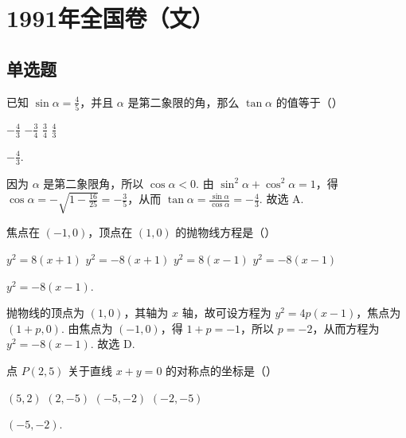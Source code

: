 \chapter{1991年全国卷（文）}
\section{单选题}

\begin{problem}
已知 \(\sin \alpha = \frac{4}{5}\)，并且 \(\alpha\) 是第二象限的角，那么 \(\tan \alpha\) 的值等于（\quad）

\choices
    {\(-\frac{4}{3}\)}
    {\(-\frac{3}{4}\)}
    {\(\frac{3}{4}\)}
    {\(\frac{4}{3}\)}
\end{problem}

\begin{answer}
\(-\frac{4}{3}\).
\end{answer}

\begin{solution}
因为 \(\alpha\) 是第二象限角，所以 \(\cos\alpha<0\). 由 \(\sin^2\alpha+\cos^2\alpha=1\)，得 \(\cos\alpha=-\sqrt{1-\frac{16}{25}}=-\frac{3}{5}\)，从而 \(\tan\alpha=\frac{\sin\alpha}{\cos\alpha}=-\frac{4}{3}\). 故选 A.
\end{solution}

\begin{problem}
焦点在 \((-1,0)\)，顶点在 \((1,0)\) 的抛物线方程是（\quad）

\choices
    {\(y^{2} = 8(x + 1)\)}
    {\(y^{2} = -8(x + 1)\)}
    {\(y^{2} = 8(x - 1)\)}
    {\(y^{2} = -8(x - 1)\)}
\end{problem}

\begin{answer}
\(y^{2}=-8(x-1)\).
\end{answer}

\begin{solution}
抛物线的顶点为 \((1,0)\)，其轴为 \(x\) 轴，故可设方程为 \(y^2=4p(x-1)\)，焦点为 \((1+p,0)\). 由焦点为 \((-1,0)\)，得 \(1+p=-1\)，所以 \(p=-2\)，从而方程为 \(y^2=-8(x-1)\). 故选 D.
\end{solution}

\begin{problem}
点 \(P(2,5)\) 关于直线 \(x + y = 0\) 的对称点的坐标是（\quad）

\choices
    {\((5,2)\)}
    {\((2,-5)\)}
    {\((-5,-2)\)}
    {\((-2,-5)\)}
\end{problem}

\begin{answer}
\((-5,-2)\).
\end{answer}

